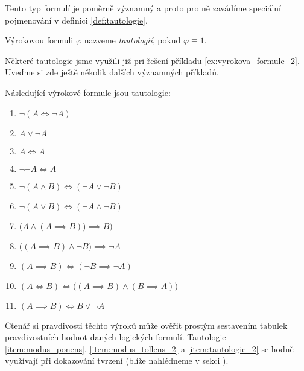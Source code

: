Tento typ formulí je poměrně významný a proto pro ně zavádíme speciální pojmenování v definici \ref{def:tautologie}.
\begin{definition}[Tautologie]\label{def:tautologie}
    Výrokovou formuli $\varphi$ nazveme \emph{tautologií}, pokud $\varphi\equiv 1$.
\end{definition}

Některé tautologie jsme využili již pri řešení příkladu \ref{ex:vyrokova_formule_2}. Uveďme si zde ještě několik dalších významných příkladů.
\begin{theorem}\label{thm:vyznamne_tautologie}
    Následující výrokové formule jsou tautologie:
    \begin{enumerate}[label=(\roman*)]
        \item\label{item:tautologie_1} $\neg (A \iff \neg A)$
        \item\label{item:zakon_vylouceneho_tretiho} $A \lor \neg A$ 
        \item\label{item:zakon_identity} $A \iff A$ 
        \item\label{item:zakon_dvoji_negace} $\neg\neg A \iff A$ 
        \item\label{item:de_morgan_1} $\neg (A \land B) \iff (\neg A \lor \neg B)$ 
        \item\label{item:de_morgan_2} $\neg (A \lor B) \iff (\neg A \land \neg B)$ 
        \item\label{item:modus_ponens} $\big(A \land (A \implies B)\big) \implies B)$ 
        \item\label{item:modus_tollens_1} $\big((A \implies B) \land \neg B\big) \implies \neg A$ 
        \item\label{item:modus_tollens_2} $(A \implies B) \iff (\neg B \implies \neg A)$
        \item\label{item:tautologie_2} $(A \iff B) \iff \big((A \implies B) \land (B \implies A)\big)$
        \item\label{item:tautologie_3} $(A \implies B) \iff B \lor \neg A$
    \end{enumerate}
\end{theorem}

Čtenář si pravdivosti těchto výroků může ověřit prostým sestavením tabulek pravdivostních hodnot daných logických formulí. Tautologie \ref{item:modus_ponens}, \ref{item:modus_tollens_2} a \ref{item:tautologie_2} se hodně využívají při dokazování tvrzení (blíže nahlédneme v sekci ).